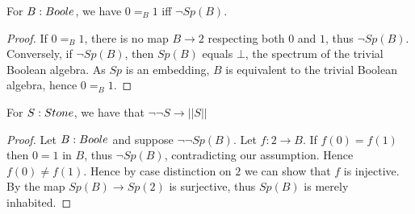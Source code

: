 \begin{lemma}\label{SpectrumEmptyIff01Equal}
  For $B:\Boole$, we have $0=_B1$ iff $\neg Sp(B)$.
\end{lemma}
\begin{proof}
  If $0=_B1$, there is no map $B\to 2$ respecting both $0$ and $1$, thus $\neg Sp(B)$. 
  Conversely, if $\neg Sp(B)$, then 
  $Sp(B)$ equals $\bot$, the spectrum of the trivial Boolean algebra. 
  As $Sp$ is an embedding, $B$ is equivalent to the trivial Boolean algebra, hence $0=_B1$. 
\end{proof}
\begin{corollary}\label{LemSurjectionsFormalToCompleteness}
 For $S:\Stone$, we have that $\neg \neg S \to || S ||$
\end{corollary}
\begin{proof}
  Let $B:\Boole$ and suppose $\neg \neg Sp(B)$. 
  Let $f:2 \to B$. If $f(0) = f(1)$ then $0=1$ in $B$, thus $\neg Sp(B)$, 
  contradicting our assumption. Hence $f(0)\neq f(1)$. 
  Hence by case distinction on $2$ we can show that $f$ is injective. 
  By  the map $Sp(B) \to Sp(2)$ is surjective, 
  thus $Sp(B)$ is merely inhabited. 
\end{proof} 





